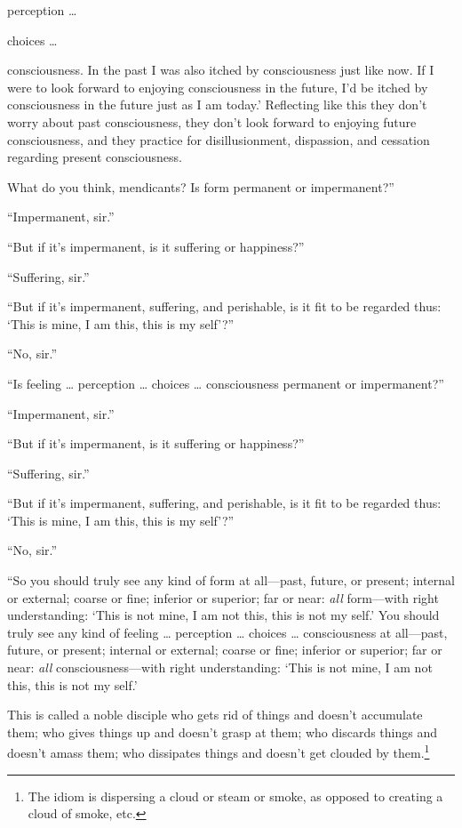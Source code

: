 \documentclass[12pt,openany]{book}%
\begin{document}
perception … 

choices … 

consciousness. In the past I was also itched by consciousness just like now. If I were to look forward to enjoying consciousness in the future, I’d be itched by consciousness in the future just as I am today.’ Reflecting like this they don’t worry about past consciousness, they don’t look forward to enjoying future consciousness, and they practice for disillusionment, dispassion, and cessation regarding present consciousness. 

What do you think, mendicants? Is form permanent or impermanent?” 

“Impermanent, sir.” 

“But if it’s impermanent, is it suffering or happiness?” 

“Suffering, sir.” 

“But if it’s impermanent, suffering, and perishable, is it fit to be regarded thus: ‘This is mine, I am this, this is my self’?” 

“No, sir.” 

“Is feeling … perception … choices … consciousness permanent or impermanent?” 

“Impermanent, sir.” 

“But if it’s impermanent, is it suffering or happiness?” 

“Suffering, sir.” 

“But if it’s impermanent, suffering, and perishable, is it fit to be regarded thus: ‘This is mine, I am this, this is my self’?” 

“No, sir.” 

“So you should truly see any kind of form at all—past, future, or present; internal or external; coarse or fine; inferior or superior; far or near: \emph{all} form—with right understanding: ‘This is not mine, I am not this, this is not my self.’ You should truly see any kind of feeling … perception … choices … consciousness at all—past, future, or present; internal or external; coarse or fine; inferior or superior; far or near: \emph{all} consciousness—with right understanding: ‘This is not mine, I am not this, this is not my self.’ 

This is called a noble disciple who gets rid of things and doesn’t accumulate them; who gives things up and doesn’t grasp at them; who discards things and doesn’t amass them; who dissipates things and doesn’t get clouded by them.\footnote{The idiom is dispersing a cloud or steam or smoke, as opposed to creating a cloud of smoke, etc. } 
\end{document}
